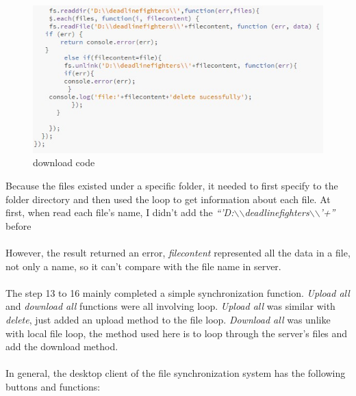 \documentclass[a4paper]{article}
\begin{document}
{\begin{figure}[h!]
\centering
\includegraphics[scale=1.2]{code3}
\caption{download code}
\label{fig:code3}
\end{figure}

Because the files existed under a specific folder, it needed to first specify to the folder directory and then used the loop to get information about each file. At first, when read each file’s name, I didn’t add the \emph{“'D:$\backslash$$\backslash$deadlinefighters$\backslash$$\backslash$'+”} before\\\\

However, the result returned an error, \emph{filecontent} represented all the data in a file, not only a name, so it can’t compare with the file name in server.\\\\

The step 13 to 16 mainly completed a simple synchronization function. \emph{Upload all} and \emph{download all} functions were all involving loop. \emph{Upload all} was similar with \emph{delete}, just added an upload method to the file loop. \emph{Download all} was unlike with local file loop, the method used here is to loop through the server's files and add the download method.\\\\

In general, the desktop client of the file synchronization system has the following buttons and functions:\\\\


}
\end{document}
